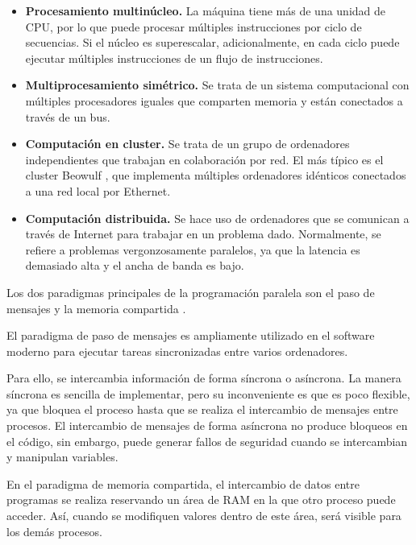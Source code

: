 \begin{itemize}
    \item \textbf{Procesamiento multinúcleo.} La máquina tiene más de una unidad de CPU, por lo que puede procesar múltiples instrucciones por ciclo de secuencias. Si el núcleo es superescalar, adicionalmente, en cada ciclo puede ejecutar múltiples instrucciones de un flujo de instrucciones.
    \item \textbf{Multiprocesamiento simétrico.} Se trata de un sistema computacional con múltiples procesadores iguales que comparten memoria y están conectados a través de un bus.
    \item \textbf{Computación en cluster.} Se trata de un grupo de ordenadores independientes que trabajan en colaboración por red. El más típico es el cluster Beowulf \cite{beowulf}, que implementa múltiples ordenadores idénticos conectados a una red local por Ethernet.
    \item \textbf{Computación distribuida. } Se hace uso de ordenadores que se comunican a través de Internet para trabajar en un problema dado. Normalmente, se refiere a problemas vergonzosamente paralelos, ya que la latencia es demasiado alta y el ancha de banda es bajo.
\end{itemize}

\vspace{2mm}
Los dos paradigmas principales de la programación paralela son el paso de mensajes y la memoria compartida \cite{paradigmasparalelismo}.
\vspace{2mm}

El paradigma de paso de mensajes es ampliamente utilizado en el software moderno para ejecutar tareas sincronizadas entre varios ordenadores.

\vspace{2mm}
Para ello, se intercambia información de forma síncrona o asíncrona. La manera síncrona es sencilla de implementar, pero su inconveniente es que es poco flexible, ya que bloquea el proceso hasta que se realiza el intercambio de mensajes entre procesos. El intercambio de mensajes de forma asíncrona no produce bloqueos en el código, sin embargo, puede generar fallos de seguridad cuando se intercambian y manipulan variables.

\vspace{2mm}
En el paradigma de memoria compartida, el intercambio de datos entre programas se realiza reservando un área de RAM en la que otro proceso puede acceder. Así, cuando se modifiquen valores dentro de este área, será visible para los demás procesos.

